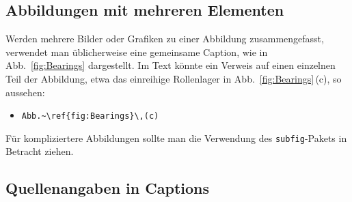 \subsection{Abbildungen mit mehreren Elementen}

Werden mehrere Bilder oder Grafiken zu einer Abbildung zusammengefasst, 
verwendet man üblicherweise eine gemeinsame Caption, wie in Abb.~\ref{fig:Bearings}
dargestellt. Im Text könnte ein Verweis auf einen einzelnen Teil der Abbildung, etwa das 
einreihige Rollenlager in Abb.~\ref{fig:Bearings}\,(c), so aussehen:
%
\begin{itemize}
\item[] \verb!Abb.~\ref{fig:Bearings}\,(c)! 
\end{itemize}
%
Für kompliziertere Abbildungen sollte man die Verwendung des 
\texttt{subfig}-Pakets \cite{Cochran05} in Betracht ziehen.


\subsection{Quellenangaben in Captions}
\label{sec:QuellenangabenInCaptions}

